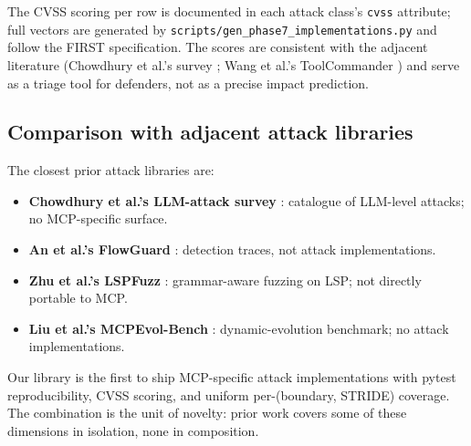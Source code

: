 The CVSS scoring per row is documented in each attack class's
\texttt{cvss} attribute; full vectors are generated by
\texttt{scripts/gen\_phase7\_implementations.py} and follow
the FIRST specification. The scores are consistent with the
adjacent literature (Chowdhury et al.'s survey
\cite{chowdhury_2024_defenses}; Wang et al.'s ToolCommander
\cite{wang_2024_toolcommander}) and serve as a triage tool
for defenders, not as a precise impact prediction.

\subsection{Comparison with adjacent attack libraries}

The closest prior attack libraries are:

\begin{itemize}
  \item \textbf{Chowdhury et al.'s LLM-attack survey}
        \cite{chowdhury_2024_defenses}: catalogue of LLM-level
        attacks; no MCP-specific surface.
  \item \textbf{An et al.'s FlowGuard}
        \cite{an_2026_flowguard}: detection traces, not
        attack implementations.
  \item \textbf{Zhu et al.'s LSPFuzz}
        \cite{zhu_2025_lspfuzz}: grammar-aware fuzzing on
        LSP; not directly portable to MCP.
  \item \textbf{Liu et al.'s MCPEvol-Bench}
        \cite{liu_2026_mcpevol}: dynamic-evolution benchmark;
        no attack implementations.
\end{itemize}

Our library is the first to ship MCP-specific attack
implementations with pytest reproducibility, CVSS scoring,
and uniform per-(boundary, STRIDE) coverage. The combination
is the unit of novelty: prior work covers some of these
dimensions in isolation, none in composition.